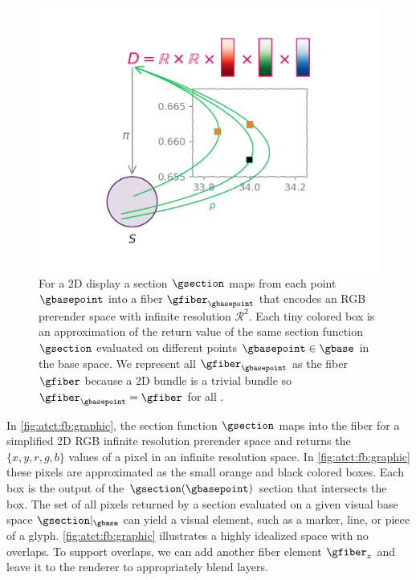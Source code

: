 \documentclass[10pt,journal,compsoc]{IEEEtran}
\theoremstyle{definition}
\theoremstyle{remark}
\begin{document}
\begin{figure}[h!]
  \includegraphics[width=1\columnwidth]{fb_rho.png}
  \caption{For a 2D display a section $\gsection$ maps from each point $\gbasepoint$ into a fiber $\gfiber_{\gbasepoint}$ that encodes an RGB prerender space with infinite resolution $\mathcal{R}^{2}$. Each tiny colored box is an approximation of the return value of the same section function $\gsection$ evaluated on different points $\gbasepoint \in \gbase$ in the base space. We represent all $\gfiber_{\gbasepoint}$ as the fiber $\gfiber$ because a 2D bundle is a trivial bundle so $\gfiber_{\gbasepoint} = \gfiber$ for all \gbasepoint.
  \label{fig:atct:fb:graphic}}
\end{figure}

In \autoref{fig:atct:fb:graphic}, the section function $\gsection$ maps into the fiber for a simplified 2D RGB infinite resolution prerender space and returns the $\{x,y,r,g,b\}$ values of a pixel in an infinite resolution space. In \autoref{fig:atct:fb:graphic} these pixels are approximated as the small orange and black colored boxes. Each box is the output of the $\gsection(\gbasepoint)$ section that intersects the box. The set of all pixels returned by a section evaluated on a given visual base space $\gsection|_{\gbase}$ can yield a visual element, such as a marker, line, or piece of a glyph. \autoref{fig:atct:fb:graphic} illustrates a highly idealized space with no overlaps. To support overlaps, we can add another fiber element $\gfiber_{z}$ and leave it to the renderer to appropriately blend layers. 
\end{document}
